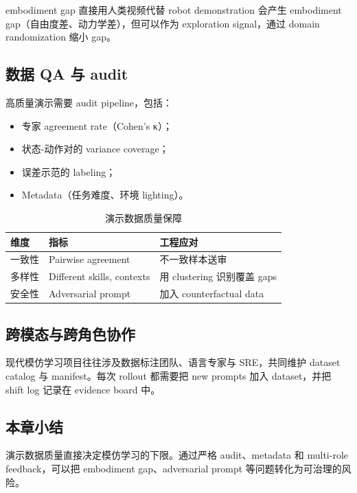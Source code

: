 \documentclass[a4paper]{article}
\begin{document}
\begin{knowledgebox}{embodiment gap}
直接用人类视频代替 robot demonstration 会产生 embodiment gap（自由度差、动力学差），但可以作为 exploration signal，通过 domain randomization 缩小 gap。
\end{knowledgebox}

\subsection{数据 QA 与 audit}

高质量演示需要 audit pipeline，包括：
\begin{itemize}
    \item 专家 agreement rate（Cohen's κ）；
    \item 状态-动作对的 variance coverage；
    \item 误差示范的 labeling；
    \item Metadata（任务难度、环境 lighting）。
\end{itemize}

\begin{table}[H]
\centering
\begin{tabular}{p{} p{} p{}}
\toprule
维度 & 指标 & 工程应对 \\
\midrule
一致性 & Pairwise agreement & 不一致样本送审 \\
多样性 & Different skills, contexts & 用 clustering 识别覆盖 gaps \\
安全性 & Adversarial prompt & 加入 counterfactual data \\
\bottomrule
\end{tabular}
\caption{演示数据质量保障}
\end{table}

\subsection{跨模态与跨角色协作}

现代模仿学习项目往往涉及数据标注团队、语言专家与 SRE，共同维护 dataset catalog 与 manifest。每次 rollout 都需要把 new prompts 加入 dataset，并把 shift log 记录在 evidence board 中。

\subsection{本章小结}

演示数据质量直接决定模仿学习的下限。通过严格 audit、metadata 和 multi-role feedback，可以把 embodiment gap、adversarial prompt 等问题转化为可治理的风险。
\end{document}

